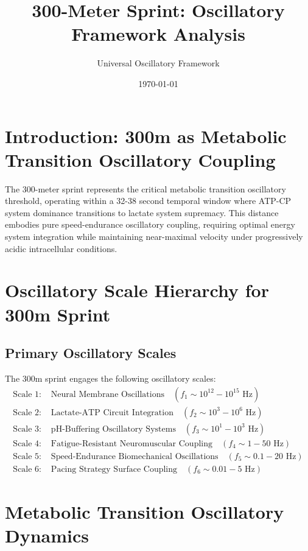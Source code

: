 \documentclass[12pt]{article}
\title{300-Meter Sprint: Oscillatory Framework Analysis}
\author{Universal Oscillatory Framework}
\date{\today}
\begin{document}
\maketitle

\section{Introduction: 300m as Metabolic Transition Oscillatory Coupling}

The 300-meter sprint represents the critical metabolic transition oscillatory threshold, operating within a 32-38 second temporal window where ATP-CP system dominance transitions to lactate system supremacy. This distance embodies pure speed-endurance oscillatory coupling, requiring optimal energy system integration while maintaining near-maximal velocity under progressively acidic intracellular conditions.

\section{Oscillatory Scale Hierarchy for 300m Sprint}

\subsection{Primary Oscillatory Scales}

\begin{definition}
The 300m sprint engages the following oscillatory scales:
\begin{align}
\text{Scale 1: } &\text{Neural Membrane Oscillations} \quad (f_1 \sim 10^{12}-10^{15} \text{ Hz}) \\
\text{Scale 2: } &\text{Lactate-ATP Circuit Integration} \quad (f_2 \sim 10^3-10^6 \text{ Hz}) \\
\text{Scale 3: } &\text{pH-Buffering Oscillatory Systems} \quad (f_3 \sim 10^{1}-10^{3} \text{ Hz}) \\
\text{Scale 4: } &\text{Fatigue-Resistant Neuromuscular Coupling} \quad (f_4 \sim 1-50 \text{ Hz}) \\
\text{Scale 5: } &\text{Speed-Endurance Biomechanical Oscillations} \quad (f_5 \sim 0.1-20 \text{ Hz}) \\
\text{Scale 6: } &\text{Pacing Strategy Surface Coupling} \quad (f_6 \sim 0.01-5 \text{ Hz})
\end{align}
\end{definition}

\section{Metabolic Transition Oscillatory Dynamics}
\end{document}
